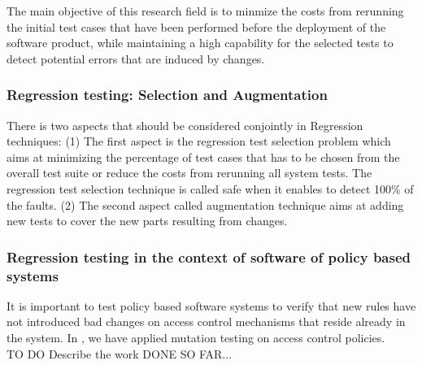 The main objective of this research field is to minmize the costs from rerunning the initial test cases that have been performed before the deployment of the software product, while 
maintaining a high capability for the selected tests to detect potential errors that are induced by changes.


\subsubsection{Regression testing: Selection and Augmentation}
There is two aspects that should be considered conjointly in Regression techniques: (1) The first aspect is the regression test selection problem which aims at minimizing 
the percentage of test cases that has to be chosen from the overall test suite or reduce the costs from rerunning all system tests.
The regression test selection technique is called safe when it enables to detect 100\% of the faults.
(2) The second aspect called augmentation technique aims at adding new tests to cover the new parts resulting from changes.

\subsubsection{Regression testing in the context of software of policy based systems}
It is important to test policy based software systems to verify that new rules have not introduced bad changes on access control mechanisms that reside already in the system.
In \cite{mouelhi09:tranforming}, we have applied mutation testing on access control policies.
\\
TO DO Describe the work DONE SO FAR...





